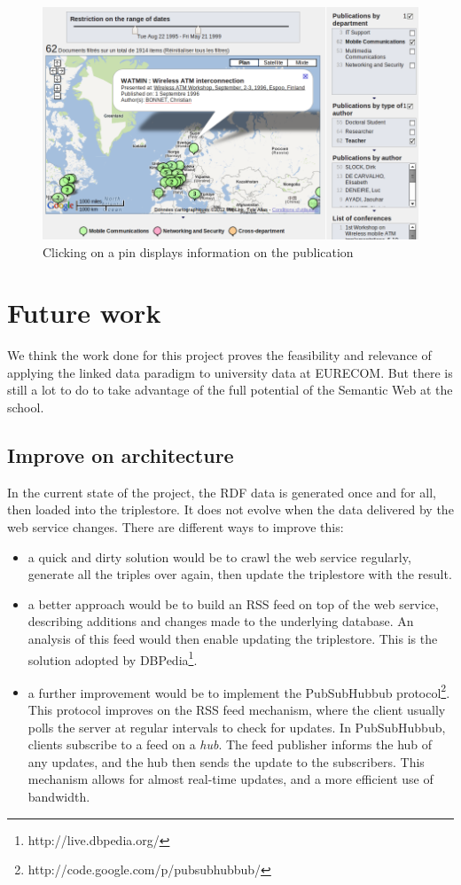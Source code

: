 \documentclass[a4paper,11pt]{report}
\begin{document}
\begin{figure}[htbp]
\centering
\includegraphics[width=\textwidth]{map6}
\caption{Clicking on a pin displays information on the publication}
\end{figure}



\chapter{Future work}%
We think the work done for this project proves the feasibility and relevance of applying the linked data paradigm to university data at \mbox{EURECOM}. But there is still a lot to do to take advantage of the full potential of the Semantic Web at the school.

\section*{Improve on architecture}
In the current state of the project, the RDF data is generated once and for all, then loaded into the triplestore. It does not evolve when the data delivered by the web service changes. There are different ways to improve this:
\begin{itemize}
\item a quick and dirty solution would be to crawl the web service regularly, generate all the triples over again, then update the triplestore with the result.
\item a better approach would be to build an RSS feed on top of the web service, describing additions and changes made to the underlying database. An analysis of this feed would then enable updating the triplestore. This is the solution adopted by DBPedia\footnote{http://live.dbpedia.org/}.
\item a further improvement would be to implement the PubSubHubbub protocol\footnote{http://code.google.com/p/pubsubhubbub/}. This protocol improves on the RSS feed mechanism, where the client usually polls the server at regular intervals to check for updates. In PubSubHubbub, clients subscribe to a feed on a \emph{hub}. The feed publisher informs the hub of any updates, and the hub then sends the update to the subscribers. This mechanism allows for almost real-time updates, and a more efficient use of bandwidth. 
\end{itemize}
\end{document}
